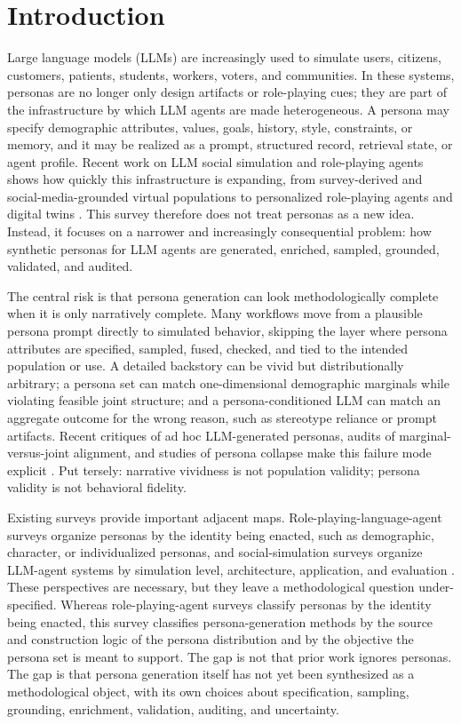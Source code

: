 \section{Introduction}
Large language models (LLMs) are increasingly used to simulate users, citizens,
customers, patients, students, workers, voters, and communities. In these
systems, personas are no longer only design artifacts or role-playing cues; they
are part of the infrastructure by which LLM agents are made heterogeneous. A
persona may specify demographic attributes, values, goals, history, style,
constraints, or memory, and it may be realized as a prompt, structured record,
retrieval state, or agent profile. Recent work on LLM social simulation and
role-playing agents shows how quickly this infrastructure is expanding, from
survey-derived and social-media-grounded virtual populations to personalized
role-playing agents and digital twins \citep{arxiv241203563,arxiv240418231,arxiv251121722,arxiv250714922}.
This survey therefore does not treat personas as a new idea. Instead, it focuses
on a narrower and increasingly consequential problem: how synthetic personas for
LLM agents are generated, enriched, sampled, grounded, validated, and audited.

The central risk is that persona generation can look methodologically complete
when it is only narratively complete. Many workflows move from a plausible
persona prompt directly to simulated behavior, skipping the layer where persona
attributes are specified, sampled, fused, checked, and tied to the intended
population or use. A detailed backstory can be vivid but distributionally
arbitrary; a persona set can match one-dimensional demographic marginals while
violating feasible joint structure; and a persona-conditioned LLM can match an
aggregate outcome for the wrong reason, such as stereotype reliance or prompt
artifacts. Recent critiques of ad hoc LLM-generated personas, audits of
marginal-versus-joint alignment, and studies of persona collapse make this
failure mode explicit \citep{arxiv250316527,arxiv260612433,arxiv260424698}.
Put tersely: narrative vividness is not population validity; persona validity is
not behavioral fidelity.

Existing surveys provide important adjacent maps. Role-playing-language-agent
surveys organize personas by the identity being enacted, such as demographic,
character, or individualized personas, and social-simulation surveys organize
LLM-agent systems by simulation level, architecture, application, and evaluation
\citep{arxiv240418231,arxiv241203563}. These perspectives are necessary, but
they leave a methodological question under-specified. Whereas role-playing-agent
surveys classify personas by the identity being enacted, this survey classifies
persona-generation methods by the source and construction logic of the persona
distribution and by the objective the persona set is meant to support. The gap
is not that prior work ignores personas. The gap is that persona generation
itself has not yet been synthesized as a methodological object, with its own
choices about specification, sampling, grounding, enrichment, validation,
auditing, and uncertainty.

